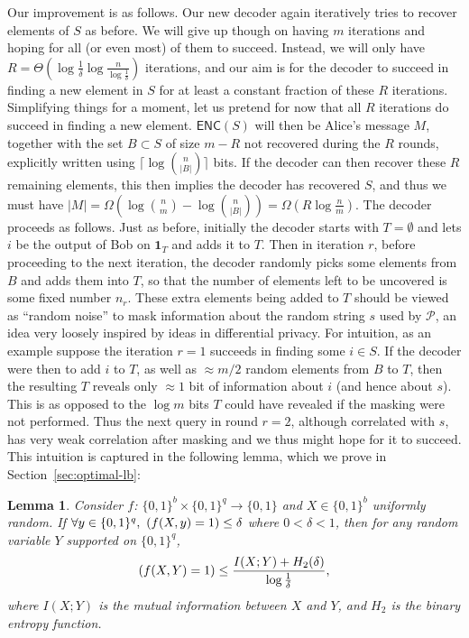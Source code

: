 \documentclass[11pt]{article}
\newtheorem{lemma}{Lemma}
\let\Pr\relax
\DeclareMathOperator*{\Pr}{\mathbb{P}}
\newcommand{\enc}{\textsf{ENC}\xspace}
\begin{document}
Our improvement is as follows. Our new decoder again iteratively tries to recover elements of $S$ as before. We will give up though on having $m$ iterations and hoping for all (or even most) of them to succeed. Instead, we will only have $R = \Theta(\log \frac 1{\delta}\log \frac n{\log \frac 1{\delta}})$ iterations, and our aim is for the decoder to succeed in finding a new element in $S$ for at least a constant fraction of these $R$ iterations. Simplifying things for a moment, let us pretend for now that all $R$ iterations do succeed in finding a new element. $\enc(S)$ will then be Alice's message $M$, together with the set $B\subset S$ of size $m-R$ not recovered during the $R$ rounds, explicitly written using $\lceil\log{n \choose |B|}\rceil$ bits. If the decoder can then recover these $R$ remaining elements, this then implies the decoder has recovered $S$, and thus we must have $|M| = \Omega(\log{n\choose m} - \log{n \choose |B|}) = \Omega(R\log \frac nm)$. The decoder proceeds as follows. Just as before, initially the decoder starts with $T = \emptyset$ and lets $i$ be the output of Bob on $\mathbf{1}_T$ and adds it to $T$. Then in iteration $r$, before proceeding to the next iteration, the decoder randomly picks some elements from $B$ and adds them into $T$, so that the number of elements left to be uncovered is some fixed number $n_r$. These extra elements being added to $T$ should be viewed as ``random noise'' to mask information about the random string $s$ used by $\mathcal{P}$, an idea very loosely inspired by ideas in differential privacy. For intuition, as an example suppose the iteration $r=1$ succeeds in finding some $i\in S$. If the decoder were then to add $i$ to $T$, as well as $\approx m/2$ random elements from $B$ to $T$, then the resulting $T$ reveals only $\approx 1$ bit of information about $i$ (and hence about $s$). This is as opposed to the $\log m$ bits $T$ could have revealed if the masking were not performed. Thus the next query in round $r=2$, although correlated with $s$, has very weak correlation after masking and we thus might hope for it to succeed. This intuition is captured in the following lemma, which we prove in Section~\ref{sec:optimal-lb}:
\begin{lemma}\label{lem:information}
  Consider $f$: $\{0,1\}^b\times \{0,1\}^q\rightarrow \{0,1\}$ and $X\in\{0,1\}^b$ uniformly random. If $\forall y\in \{0,1\}^q,\ \Pr(f(X,y)=1)\le \delta$ where $0<\delta<1$, then for any random variable $Y$ supported on $\{0,1\}^q$,
  \begin{align}
    \Pr(f(X,Y)=1)\le \frac{I(X;Y)+H_2(\delta)}{\log \frac{1}{\delta}}, \label{eqn:adaptivity}
  \end{align}
  where $I(X;Y)$ is the mutual information between $X$ and $Y$, and $H_2$ is the binary entropy function.
\end{lemma}
\end{document}
